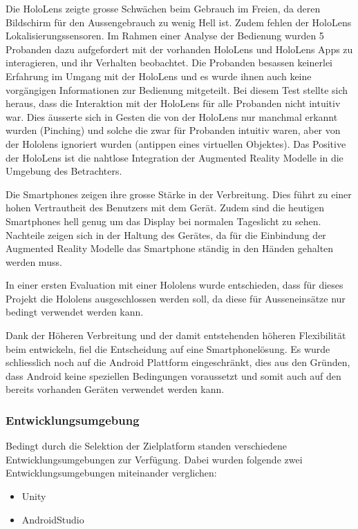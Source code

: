 \documentclass[a4paper]{scrreprt}
\begin{document}
Die HoloLens zeigte grosse Schwächen beim Gebrauch im Freien, da deren Bildschirm für den Aussengebrauch zu wenig Hell ist. Zudem fehlen der HoloLens Lokalisierungssensoren. Im Rahmen einer Analyse der Bedienung wurden 5 Probanden dazu aufgefordert mit der vorhanden HoloLens und HoloLens Apps zu interagieren, und ihr Verhalten beobachtet. Die Probanden besassen keinerlei Erfahrung im Umgang mit der HoloLens und es wurde ihnen auch keine vorgängigen Informationen zur Bedienung mitgeteilt. Bei diesem Test stellte sich heraus, dass die Interaktion mit der HoloLens für alle Probanden nicht intuitiv war. Dies äusserte sich in Gesten die von der HoloLens nur manchmal erkannt wurden (Pinching) und solche die zwar für Probanden intuitiv waren, aber von der Hololens ignoriert wurden (antippen eines virtuellen Objektes).
Das Positive der HoloLens ist die nahtlose Integration der Augmented Reality Modelle in die Umgebung des Betrachters. 
 
Die Smartphones zeigen ihre grosse Stärke in der Verbreitung. Dies führt zu einer hohen Vertrautheit des Benutzers mit dem Gerät. Zudem sind die heutigen Smartphones hell genug um das Display bei normalen Tageslicht zu sehen.
Nachteile zeigen sich in der Haltung des Gerätes, da für die Einbindung der Augmented Reality Modelle das Smartphone ständig in den Händen gehalten werden muss.

In einer ersten Evaluation mit einer Hololens wurde entschieden, dass für dieses Projekt die Hololens ausgeschlossen werden soll, da diese für Ausseneinsätze nur bedingt verwendet werden kann.

Dank der Höheren Verbreitung und der damit entstehenden höheren Flexibilität beim entwickeln, fiel die Entscheidung auf eine Smartphonelösung. Es wurde schliesslich noch auf die Android Plattform eingeschränkt, dies aus den Gründen, dass Android keine speziellen Bedingungen voraussetzt und somit auch auf den bereits vorhanden Geräten verwendet werden kann. 

\subsubsection{Entwicklungsumgebung}
\label{ssec:EvalPlattform}
Bedingt durch die Selektion der Zielplatform standen verschiedene Entwicklungsumgebungen zur Verfügung. Dabei wurden folgende zwei Entwicklungsumgebungen miteinander verglichen:
\begin{itemize}
\item Unity
\item AndroidStudio
\end{itemize}
\end{document}
